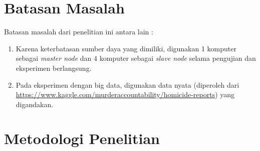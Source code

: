 \section{Batasan Masalah}

Batasan masalah dari penelitian ini antara lain :
\begin{enumerate}
	\item Karena keterbatasan sumber daya yang dimiliki, digunakan 1 komputer sebagai \textit{master node} dan 4 komputer sebagai \textit{slave node} selama pengujian dan eksperimen berlangsung.
	\item Pada eksperimen dengan big data, digunakan data nyata (diperoleh dari \url{https://www.kaggle.com/murderaccountability/homicide-reports}) yang digandakan.
\end{enumerate}

\section{Metodologi Penelitian}

